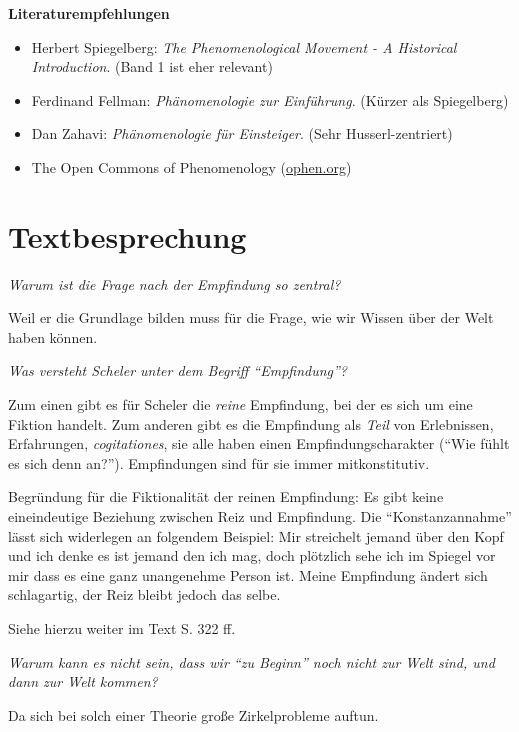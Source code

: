 \documentclass[a4paper, emulatestandardclasses]{scrartcl}
\begin{document}
\noindent\textbf{Literaturempfehlungen}

\begin{itemize}
  \item Herbert Spiegelberg: \emph{The Phenomenological Movement - A Historical Introduction}. (Band 1 ist eher relevant)
  \item Ferdinand Fellman: \emph{Phänomenologie zur Einführung}. (Kürzer als Spiegelberg)
  \item Dan Zahavi: \emph{Phänomenologie für Einsteiger}. (Sehr Husserl-zentriert)
  \item The Open Commons of Phenomenology (\url{ophen.org})
\end{itemize}

\section*{Textbesprechung}

\emph{Warum ist die Frage nach der Empfindung so zentral?}

Weil er die Grundlage bilden muss für die Frage, wie wir Wissen über der Welt haben können.\newline

\noindent \emph{Was versteht Scheler unter dem Begriff "`Empfindung"'?}

Zum einen gibt es für Scheler die \emph{reine} Empfindung, bei der es sich um eine Fiktion handelt. Zum anderen gibt es die Empfindung als \emph{Teil} von Erlebnissen, Erfahrungen, \emph{cogitationes}, sie alle haben einen Empfindungscharakter ("`Wie fühlt es sich denn an?"'). Empfindungen sind für sie immer mitkonstitutiv.

Begründung für die Fiktionalität der reinen Empfindung: Es gibt keine eineindeutige Beziehung zwischen Reiz und Empfindung. Die "`Konstanzannahme"' lässt sich widerlegen an folgendem Beispiel: Mir streichelt jemand über den Kopf und ich denke es ist jemand den ich mag, doch plötzlich sehe ich im Spiegel vor mir dass es eine ganz unangenehme Person ist. Meine Empfindung ändert sich schlagartig, der Reiz bleibt jedoch das selbe.

Siehe hierzu weiter im Text S. 322 ff.
\newline

\noindent \emph{Warum kann es nicht sein, dass wir "`zu Beginn"' noch nicht zur Welt sind, und dann zur Welt kommen?}

Da sich bei solch einer Theorie große Zirkelprobleme auftun.\newline
\end{document}

